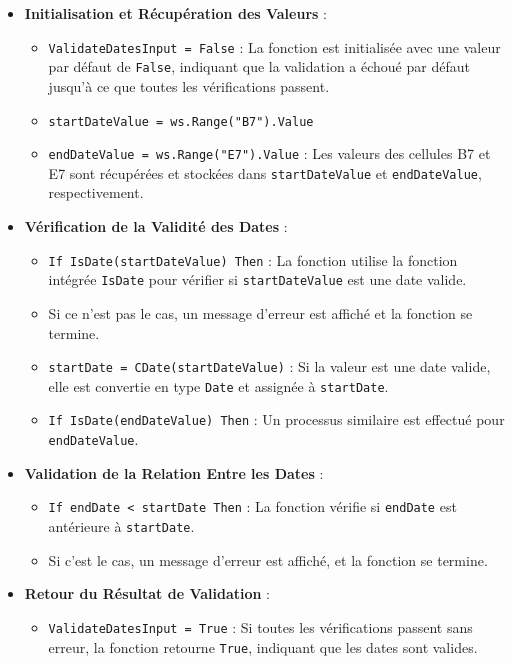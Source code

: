 \documentclass[a4paper, oneside, 12pt, final]{extreport}
\begin{document}
\begin{itemize}
    \item \textbf{Initialisation et Récupération des Valeurs} :
    \begin{itemize}
        \item \texttt{ValidateDatesInput = False} : La fonction est initialisée avec une valeur par défaut de \texttt{False}, indiquant que la validation a échoué par défaut jusqu'à ce que toutes les vérifications passent.
        \item \texttt{startDateValue = ws.Range("B7").Value}
        \item \texttt{endDateValue = ws.Range("E7").Value} : Les valeurs des cellules B7 et E7 sont récupérées et stockées dans \texttt{startDateValue} et \texttt{endDateValue}, respectivement.
    \end{itemize}
    
    \item \textbf{Vérification de la Validité des Dates} :
    \begin{itemize}
        \item \texttt{If IsDate(startDateValue) Then} : La fonction utilise la fonction intégrée \texttt{IsDate} pour vérifier si \texttt{startDateValue} est une date valide. 
        \item Si ce n'est pas le cas, un message d'erreur est affiché et la fonction se termine.
        \item \texttt{startDate = CDate(startDateValue)} : Si la valeur est une date valide, elle est convertie en type \texttt{Date} et assignée à \texttt{startDate}.
        \item \texttt{If IsDate(endDateValue) Then} : Un processus similaire est effectué pour \texttt{endDateValue}.
    \end{itemize}
    
    \item \textbf{Validation de la Relation Entre les Dates} :
    \begin{itemize}
        \item \texttt{If endDate < startDate Then} : La fonction vérifie si \texttt{endDate} est antérieure à \texttt{startDate}. 
        \item Si c'est le cas, un message d'erreur est affiché, et la fonction se termine.
    \end{itemize}
    
    \item \textbf{Retour du Résultat de Validation} :
    \begin{itemize}
        \item \texttt{ValidateDatesInput = True} : Si toutes les vérifications passent sans erreur, la fonction retourne \texttt{True}, indiquant que les dates sont valides.
    \end{itemize}
\end{itemize}
\end{document}
